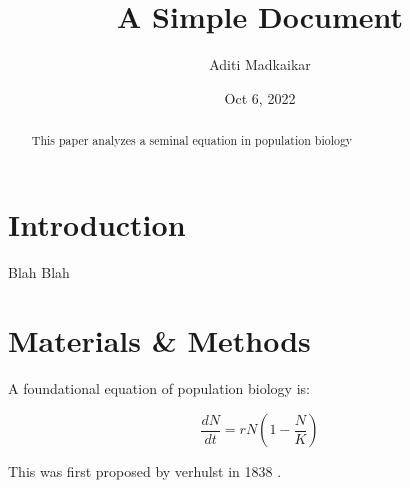 \documentclass[12pt]{article}
\title{A Simple Document}
\author{Aditi Madkaikar}
\date{Oct 6, 2022}
\begin{document}
    \maketitle

    \begin{abstract}
            This paper analyzes a seminal equation in population biology
    \end{abstract}

    \section{Introduction}
        Blah Blah
    
    \section{Materials \& Methods}
        A foundational equation of population biology is:
    
        \begin{equation}
            \frac{dN}{dt} = r N (1 - \frac{N}{K})
        \end{equation}
        
        This was first proposed by verhulst in 1838 \cite{verhulst1838notice}.

        

        
        
    
\end{document}
